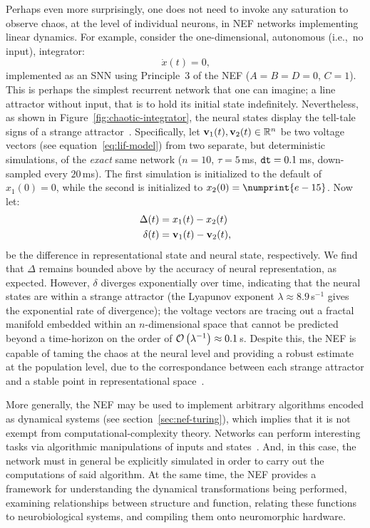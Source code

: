 Perhaps even more surprisingly, one does not need to invoke any saturation to observe chaos, at the level of individual neurons, in NEF networks implementing linear dynamics.
For example, consider the one-dimensional, autonomous (i.e.,~no input), integrator:
$$\dot{x}(t) = 0 \text{,}$$
implemented as an SNN using Principle~3 of the NEF ($A = B = D = 0$, $C = 1$).
This is perhaps the simplest recurrent network that one can imagine; a line attractor without input, that is to hold its initial state indefinitely.
Nevertheless, as shown in Figure~\ref{fig:chaotic-integrator}, the neural states display the tell-tale signs of a strange attractor~\citep[cf.~][Figure~9.3.5]{strogatz2000nonlinear}.
Specifically, let $\mathbf{v}_1(t), \mathbf{v}_2(t) \in \mathbb{R}^n$ be two voltage vectors (see equation~\ref{eq:lif-model}) from two separate, but deterministic simulations, of the \emph{exact} same network ($n = 10$, $\tau = 5$\,ms, $\texttt{dt}{} = 0.1$\,ms, down-sampled every $20$\,ms).
The first simulation is initialized to the default of $x_1(0) = 0$, while the second is initialized to $x_2(0) = \numprint{e-15}$.
Now let:
\begin{align*}
\Delta(t) &= x_1(t) - x_2(t) \\
\delta(t) &= \mathbf{v}_1(t) - \mathbf{v}_2(t) \text{,}
\end{align*}
be the difference in representational state and neural state, respectively.
We find that $\Delta$ remains bounded above by the accuracy of neural representation, as expected.
However, $\delta$ diverges exponentially over time, indicating that the neural states are within a strange attractor (the Lyapunov exponent $\lambda \approx 8.9$\,s${}^{-1}$ gives the exponential rate of divergence); the voltage vectors are tracing out a fractal manifold embedded within an $n$-dimensional space that cannot be predicted beyond a time-horizon on the order of $\mathcal{O}\left({\lambda^{-1}}\right) \approx 0.1$\,s.
Despite this, the NEF is capable of taming the chaos at the neural level and providing a robust estimate at the population level, due to the correspondance between each strange attractor and a stable point in representational space~\citep[][p.~237]{eliasmith2003a}.

More generally, the NEF may be used to implement arbitrary algorithms encoded as dynamical systems (see section~\ref{sec:nef-turing}), which implies that it is not exempt from computational-complexity theory. 
Networks can perform interesting tasks via algorithmic manipulations of inputs and states~\citep{choo2018}.
And, in this case, the network must in general be explicitly simulated in order to carry out the computations of said algorithm.
At the same time, the NEF provides a framework for understanding the dynamical transformations being performed, examining relationships between structure and function, relating these functions to neurobiological systems, and compiling them onto neuromorphic hardware.

